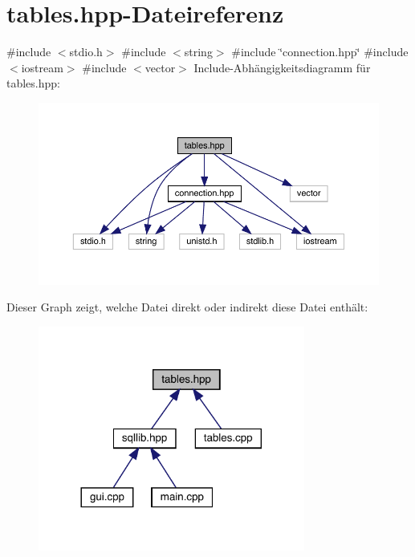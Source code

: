 \section{tables.\+hpp-\/\+Dateireferenz}
\label{tables_8hpp}
{\ttfamily \#include $<$stdio.\+h$>$}\newline
{\ttfamily \#include $<$string$>$}\newline
{\ttfamily \#include \char`\"{}connection.\+hpp\char`\"{}}\newline
{\ttfamily \#include $<$iostream$>$}\newline
{\ttfamily \#include $<$vector$>$}\newline
Include-\/\+Abhängigkeitsdiagramm für tables.\+hpp\+:\nopagebreak
\begin{figure}[H]
\begin{center}
\leavevmode
\includegraphics[width=350pt]{tables_8hpp__incl}
\end{center}
\end{figure}
Dieser Graph zeigt, welche Datei direkt oder indirekt diese Datei enthält\+:\nopagebreak
\begin{figure}[H]
\begin{center}
\leavevmode
\includegraphics[width=248pt]{tables_8hpp__dep__incl}
\end{center}
\end{figure}
